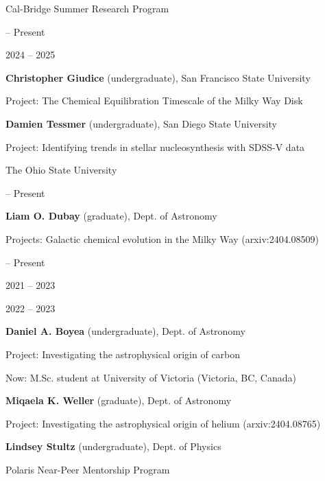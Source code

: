 \documentclass[cv.tex]{subfiles}
\begin{document}
{\color{themecolor} \large Cal-Bridge Summer Research Program}
\par\noindent
\parbox{0.18\textwidth}{%
	 -- Present \par
	\null \par
	2024 -- 2025 \par
	\null \par
}
\hspace{1mm}
\parbox{0.8\textwidth}{%
	\vspace{1mm}
	\textbf{Christopher Giudice} (undergraduate), San Francisco State University \par
	Project: The Chemical Equilibration Timescale of the Milky Way Disk \par
	\textbf{Damien Tessmer} (undergraduate), San Diego State University \par
	Project: Identifying trends in stellar nucleosynthesis with SDSS-V data \par
}

\vspace{3mm}
\noindent
{\color{themecolor} \large The Ohio State University}
\par\noindent
\parbox{0.18\textwidth}{%
	 -- Present \par
	\null \par
}
\hspace{1mm}
\parbox{0.8\textwidth}{%
	\vspace{1mm}
	\textbf{Liam O. Dubay} (graduate), Dept. of Astronomy \par
	Projects: Galactic chemical evolution in the Milky Way (arxiv:2404.08509) \par
}

\noindent
\parbox{0.18\textwidth}{%
	 -- Present \par
	\null \par
	\null \par
	2021 -- 2023 \par
	\null \par
	2022 -- 2023 \par
	\null
}
\hspace{1mm}
\parbox{0.8\textwidth}{%
	\vspace{1mm}
	\textbf{Daniel A. Boyea} (undergraduate), Dept. of Astronomy \par
	Project: Investigating the astrophysical origin of carbon \par
	Now: M.Sc. student at University of Victoria (Victoria, BC, Canada) \par
	\textbf{Miqaela K. Weller} (graduate), Dept. of Astronomy \par
	Project: Investigating the astrophysical origin of helium
	(arxiv:2404.08765) \par
	\textbf{Lindsey Stultz} (undergraduate), Dept. of Physics \par
	Polaris Near-Peer Mentorship Program
}
\end{document}
